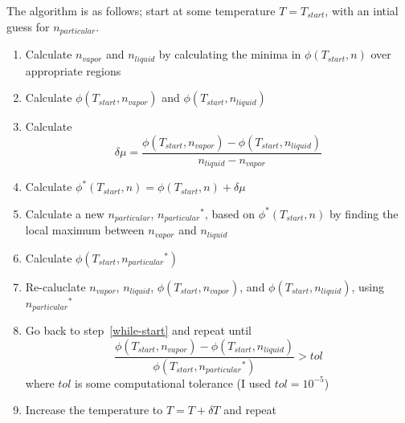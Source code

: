 \documentclass[letterpaper,twocolumn,amsmath,amssymb,prb]{revtex4-1}
\newcommand{\npart}{\ensuremath{n_{particular}}}
\newcommand{\nliq}{\ensuremath{n_{liquid}}}
\newcommand{\nvap}{\ensuremath{n_{vapor}}}
\newcommand{\1}{\ensuremath{\textbf{r}_1}}
\newcommand{\2}{\ensuremath{\textbf{r}_2}}
\newcommand{\3}{\ensuremath{\textbf{r}_3}}
\newcommand{\4}{\ensuremath{\textbf{r}_4}}
\begin{document}
The algorithm is as follows; start at some temperature $T=T_{start}$,
with an intial guess for $\npart$.
\begin{enumerate}
  \item Calculate $\nvap$ and $\nliq$ by calculating the minima in $\phi(T_{start},n)$ over appropriate regions
  \item Calculate $\phi(T_{start},\nvap)$ and $\phi(T_{start},\nliq)$ \label{while-start}
  \item Calculate \[\delta\mu = \frac{\phi(T_{start},\nvap) - \phi(T_{start},\nliq)}{\nliq - \nvap}\]
  \item Calculate $\phi^*(T_{start},n) = \phi(T_{start},n) + \delta\mu$
  \item Calculate a new $\npart$, $\npart^*$, based on $\phi^*(T_{start},n)$ by finding the local maximum between $\nvap$ and $\nliq$
  \item Calculate $\phi(T_{start},\npart^*)$
  \item Re-caluclate $\nvap$, $\nliq$, $\phi(T_{start},\nvap)$, and $\phi(T_{start},\nliq)$, using $\npart^*$
  \item Go back to step~\ref{while-start} and repeat until \[ \frac{\phi(T_{start},\nvap) - \phi(T_{start},\nliq)}{\phi(T_{start},\npart^*)} > tol  \] where $tol$ is some computational tolerance (I used $tol=10^{-5}$)
  \item Increase the temperature to $T = T + \delta T$ and repeat
\end{enumerate}
\end{document}
